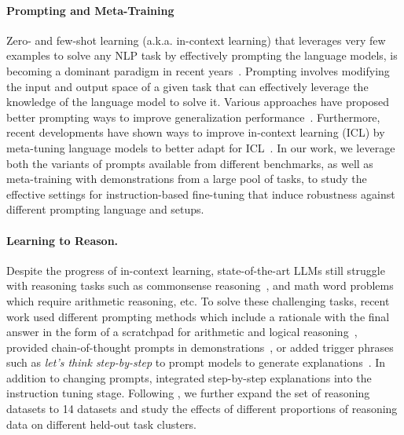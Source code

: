 \paragraph{Prompting and Meta-Training} Zero- and few-shot learning (a.k.a. in-context learning) that leverages very few examples to solve any NLP task by effectively prompting the language models, is becoming a dominant paradigm in recent years~\citep{brown2020gpt}. Prompting involves modifying the input and output space of a given task that can effectively leverage the knowledge of the language model to solve it. Various approaches have proposed better prompting ways to improve generalization performance~\citep{wei2022cot,lu2021fantastically}. Furthermore, recent developments have shown ways to improve in-context learning (ICL) by meta-tuning language models to better adapt for ICL~\citep{min2022rethinking,min2021metaicl}. In our work, we leverage both the variants of prompts available from different benchmarks, as well as meta-training with demonstrations from a large pool of tasks, to study the effective settings for instruction-based fine-tuning that induce robustness against different prompting language and setups.

\paragraph{Learning to Reason.}

Despite the progress of in-context learning, state-of-the-art LLMs still struggle with reasoning tasks such as commonsense reasoning~\citep{west-etal-2022-symbolic}, and math word problems~\citep{hendrycksmath2021} which require arithmetic reasoning, etc. To solve these challenging tasks, recent work used different prompting methods which include a rationale with the final answer in the form of a scratchpad for arithmetic and logical reasoning~\citep{nye2021show}, provided chain-of-thought prompts in demonstrations~\citep{wei2022cot}, or added trigger phrases such as \textit{let's think step-by-step} to prompt models to generate explanations~\citep{kojima2022large}. In addition to changing prompts, \citet{chung2022scaling} integrated step-by-step explanations into the instruction tuning stage. Following \cite{chung2022scaling}, we further expand the set of reasoning datasets to 14 datasets and study the effects of different proportions of reasoning data on different held-out task clusters.

